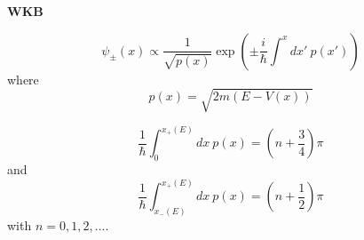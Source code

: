 {\bf WKB}

\begin{equation}
\psi_{\pm} (x) \propto \frac{1}{\sqrt{p(x)}}
  \exp(\pm \frac{i}{\hbar} \int^{x} dx' \: p(x'))
\end{equation}
where
\begin{equation}
p(x) = \sqrt{2 m (E-V(x))}
\end{equation}

\begin{equation}
\frac{1}{\hbar} \int_0^{x_+(E)} dx \: p(x) =
\left(n + \frac{3}{4} \right) \pi
\end{equation}
and
\begin{equation}
\frac{1}{\hbar} \int_{x_-(E)}^{x_+(E)} dx \: p(x) =
\left(n + \frac{1}{2} \right) \pi
\end{equation}
with $n=0,1,2,\ldots$.
